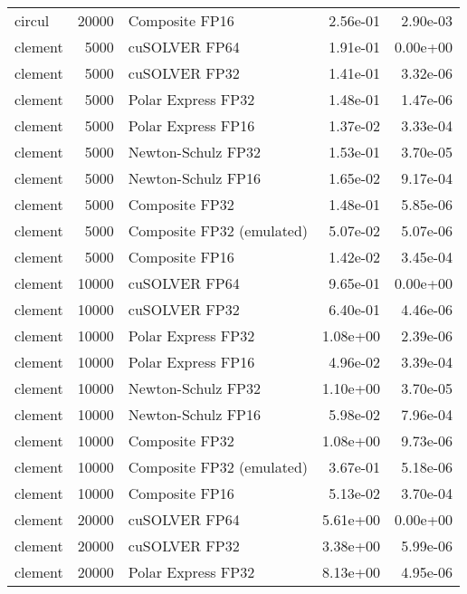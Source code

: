 \begin{table}
\begin{tabular}{lrlrr}
   circul & 20000 &            Composite FP16 &  2.56e-01 &        2.90e-03 \\
  clement &  5000 &             cuSOLVER FP64 &  1.91e-01 &        0.00e+00 \\
  clement &  5000 &             cuSOLVER FP32 &  1.41e-01 &        3.32e-06 \\
  clement &  5000 &        Polar Express FP32 &  1.48e-01 &        1.47e-06 \\
  clement &  5000 &        Polar Express FP16 &  1.37e-02 &        3.33e-04 \\
  clement &  5000 &        Newton-Schulz FP32 &  1.53e-01 &        3.70e-05 \\
  clement &  5000 &        Newton-Schulz FP16 &  1.65e-02 &        9.17e-04 \\
  clement &  5000 &            Composite FP32 &  1.48e-01 &        5.85e-06 \\
  clement &  5000 & Composite FP32 (emulated) &  5.07e-02 &        5.07e-06 \\
  clement &  5000 &            Composite FP16 &  1.42e-02 &        3.45e-04 \\
  clement & 10000 &             cuSOLVER FP64 &  9.65e-01 &        0.00e+00 \\
  clement & 10000 &             cuSOLVER FP32 &  6.40e-01 &        4.46e-06 \\
  clement & 10000 &        Polar Express FP32 &  1.08e+00 &        2.39e-06 \\
  clement & 10000 &        Polar Express FP16 &  4.96e-02 &        3.39e-04 \\
  clement & 10000 &        Newton-Schulz FP32 &  1.10e+00 &        3.70e-05 \\
  clement & 10000 &        Newton-Schulz FP16 &  5.98e-02 &        7.96e-04 \\
  clement & 10000 &            Composite FP32 &  1.08e+00 &        9.73e-06 \\
  clement & 10000 & Composite FP32 (emulated) &  3.67e-01 &        5.18e-06 \\
  clement & 10000 &            Composite FP16 &  5.13e-02 &        3.70e-04 \\
  clement & 20000 &             cuSOLVER FP64 &  5.61e+00 &        0.00e+00 \\
  clement & 20000 &             cuSOLVER FP32 &  3.38e+00 &        5.99e-06 \\
  clement & 20000 &        Polar Express FP32 &  8.13e+00 &        4.95e-06 \\

\end{tabular}
\end{table}
